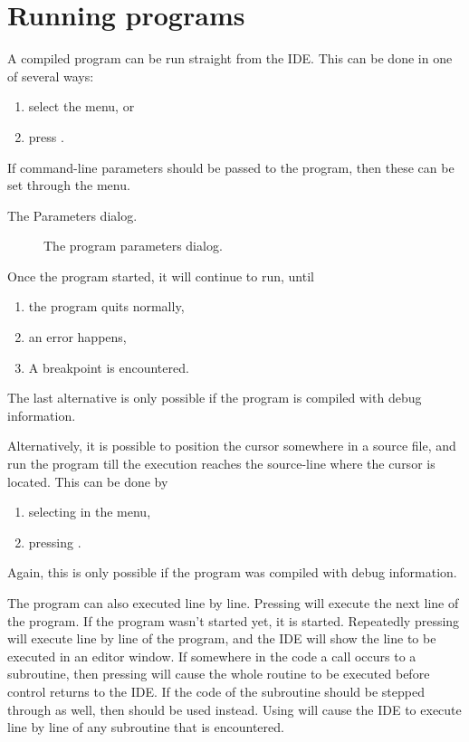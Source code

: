\section{Running programs}
\label{se:running}
A compiled program can be run straight from the IDE. This can be done
in one of several ways:
\begin{enumerate}
\item select the  menu, or
\item press .
\end{enumerate}
If command-line parameters should be passed to the program, then these
can be set through the  menu. 
\begin{htmlonly}
The Parameters dialog.
\end{htmlonly}
\begin{latexonly}
\begin{figure}[ht]
\caption{The program parameters dialog.}\label{fig:params}
\ifpdf
{}
\else
{}
\fi
\end{figure}
\end{latexonly}

Once the program started, it will continue to run, until 
\begin{enumerate}
\item the program quits normally,
\item an error happens,
\item A breakpoint is encountered.
\end{enumerate}
The last alternative is only possible if the program is compiled
with debug information.

Alternatively, it is possible to position the cursor somewhere in a
source file, and run the program till the execution reaches the
source-line where the cursor is located. This can be done by
\begin{enumerate}
\item selecting  in the menu,
\item pressing .
\end{enumerate}
Again, this is only possible if the program was compiled with debug
information.

The program can also executed line by line. Pressing  will 
execute the next line of the program. If the program wasn't started
yet, it is started. Repeatedly pressing  will execute line 
by line of the program, and the IDE will show the line to be executed 
in an editor window. If somewhere in the code a call occurs to a subroutine,
then pressing  will cause the whole routine to be executed before
control returns to the IDE. If the code of the subroutine should be stepped
through as well, then  should be used instead. Using  will
cause the IDE to execute line by line of any subroutine that is encountered.

